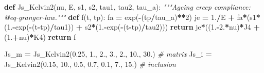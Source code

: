 \documentclass[
  a4paper,
  numbers=noendperiod,
  DIV=12]{scrreprt}
\newenvironment{Shaded}{\begin{snugshade}}{\end{snugshade}}
\newcommand{\CommentTok}[1]{\textcolor[rgb]{0.56,0.35,0.01}{\textit{#1}}}
\newcommand{\ControlFlowTok}[1]{\textcolor[rgb]{0.13,0.29,0.53}{\textbf{#1}}}
\newcommand{\DecValTok}[1]{\textcolor[rgb]{0.00,0.00,0.81}{#1}}
\newcommand{\FloatTok}[1]{\textcolor[rgb]{0.00,0.00,0.81}{#1}}
\newcommand{\KeywordTok}[1]{\textcolor[rgb]{0.13,0.29,0.53}{\textbf{#1}}}
\newcommand{\NormalTok}[1]{#1}
\newcommand{\OperatorTok}[1]{\textcolor[rgb]{0.81,0.36,0.00}{\textbf{#1}}}
\begin{document}
\begin{Shaded}
\begin{Highlighting}[]
\KeywordTok{def}\NormalTok{ Js\_Kelvin2(nu, E, s1, s2, tau1, tau2, tau\_a):}
    \CommentTok{"""Ageing creep compliance: @eq{-}granger{-}law."""}
    \KeywordTok{def}\NormalTok{ f(t, tp):}
\NormalTok{        fa }\OperatorTok{=}\NormalTok{ exp(}\OperatorTok{{-}}\NormalTok{(tp}\OperatorTok{/}\NormalTok{tau\_a)}\OperatorTok{**}\DecValTok{2}\NormalTok{)}
\NormalTok{        je }\OperatorTok{=} \FloatTok{1.}\OperatorTok{/}\NormalTok{E }\OperatorTok{+}\NormalTok{ fa}\OperatorTok{*}\NormalTok{(s1}\OperatorTok{*}\NormalTok{(}\FloatTok{1.}\OperatorTok{{-}}\NormalTok{exp(}\OperatorTok{{-}}\NormalTok{(t}\OperatorTok{{-}}\NormalTok{tp)}\OperatorTok{/}\NormalTok{tau1)) }\OperatorTok{+}\NormalTok{ s2}\OperatorTok{*}\NormalTok{(}\FloatTok{1.}\OperatorTok{{-}}\NormalTok{exp(}\OperatorTok{{-}}\NormalTok{(t}\OperatorTok{{-}}\NormalTok{tp)}\OperatorTok{/}\NormalTok{tau2)))}
        \ControlFlowTok{return}\NormalTok{ je}\OperatorTok{*}\NormalTok{((}\FloatTok{1.}\OperatorTok{{-}}\FloatTok{2.}\OperatorTok{*}\NormalTok{nu)}\OperatorTok{*}\NormalTok{J4 }\OperatorTok{+}\NormalTok{ (}\FloatTok{1.}\OperatorTok{+}\NormalTok{nu)}\OperatorTok{*}\NormalTok{K4)}
    \ControlFlowTok{return}\NormalTok{ f}

\NormalTok{Js\_m }\OperatorTok{=}\NormalTok{ Js\_Kelvin2(}\FloatTok{0.25}\NormalTok{, }\FloatTok{1.}\NormalTok{,  }\FloatTok{2.}\NormalTok{,   }\FloatTok{3.}\NormalTok{,   }\FloatTok{2.}\NormalTok{,   }\FloatTok{10.}\NormalTok{, }\FloatTok{30.}\NormalTok{)   }\CommentTok{\# matrix}
\NormalTok{Js\_i }\OperatorTok{=}\NormalTok{ Js\_Kelvin2(}\FloatTok{0.15}\NormalTok{, }\FloatTok{10.}\NormalTok{, }\FloatTok{0.5}\NormalTok{,  }\FloatTok{0.7}\NormalTok{,  }\FloatTok{0.1}\NormalTok{,  }\FloatTok{7.}\NormalTok{,  }\FloatTok{15.}\NormalTok{)  }\CommentTok{\# inclusion}


\end{Highlighting}
\end{Shaded}
\end{document}
